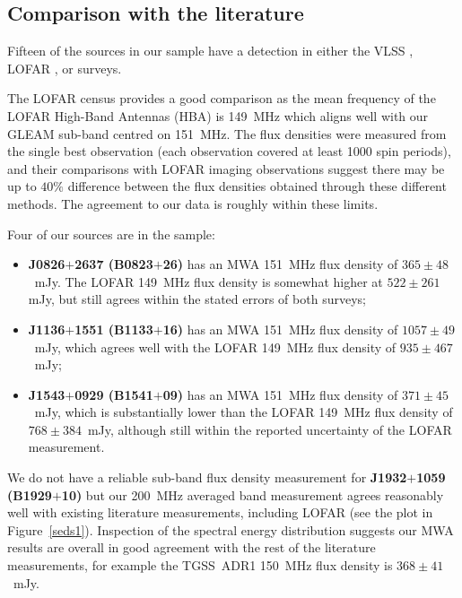 \documentclass{pasa}%
\begin{document}
\subsection{Comparison with the literature}
Fifteen of the sources in our sample have a detection in either the
VLSS \citep{cohen07,lane14}, LOFAR \citep{bilous16}, \citet{slee95} or \citet{malofeev00} surveys.

The \citet{bilous16} LOFAR census provides a good comparison as the mean frequency of the LOFAR High-Band Antennas (HBA)
is 149~MHz which aligns well with our GLEAM sub-band centred on 151~MHz.
The \citet{bilous16} flux densities were measured from the single best observation (each observation covered at least 1000 spin periods), and their comparisons with LOFAR imaging observations suggest there may be up to $40\%$ difference between the flux densities obtained through these different methods. The agreement to our data is roughly within these limits.

Four of our sources are in the \citet{bilous16} sample:
\begin{itemize}
\item {\bf J0826$+$2637 (B0823$+$26)} has an MWA 151~MHz flux density of $365\pm48$~mJy. The LOFAR 149~MHz flux density is somewhat higher at $522\pm261$mJy, but still agrees within the stated errors of both surveys;
\item {\bf J1136$+$1551 (B1133$+$16)} has an MWA 151~MHz flux density of $1057\pm49$~mJy, which agrees well with the LOFAR 149~MHz flux density of $935\pm467$~mJy;
\item {\bf J1543$+$0929 (B1541$+$09)} has an MWA 151~MHz flux density of $371\pm45$~mJy, which is substantially lower than the LOFAR 149~MHz flux density of $768\pm384$~mJy, although still within the reported uncertainty of
the LOFAR measurement.
\end{itemize}
We do not have a reliable sub-band flux density measurement for {\bf J1932$+$1059 (B1929$+$10)} but our 200~MHz
averaged band measurement agrees reasonably well with existing literature measurements, including LOFAR (see the plot in Figure~\ref{seds1}). Inspection of the spectral energy distribution suggests our MWA results are overall in good agreement with the rest of the literature measurements, for example the TGSS~ADR1 150~MHz flux density is $368\pm41$~mJy.
\end{document}
